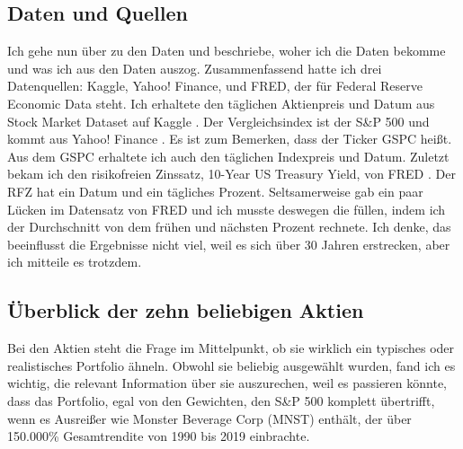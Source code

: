 \documentclass[12pt]{article}
\begin{document}
        \subsection{Daten und Quellen}
    
            Ich gehe nun über zu den Daten und beschriebe, woher ich die Daten bekomme und was ich aus den Daten auszog. 
            Zusammenfassend hatte ich drei Datenquellen: Kaggle, Yahoo! Finance, und FRED, der für Federal Reserve Economic Data steht. 
            Ich erhaltete den täglichen Aktienpreis und Datum aus Stock Market Dataset auf Kaggle \cite{onyshchak}.
            Der Vergleichsindex ist der S\&P 500 und kommt aus Yahoo! Finance \cite{yahoo}. 
            Es ist zum Bemerken, dass der Ticker GSPC heißt. Aus dem GSPC erhaltete ich auch den täglichen Indexpreis und Datum. 
            Zuletzt bekam ich den risikofreien Zinssatz, 10-Year US Treasury Yield, von FRED \cite{fred}. 
            Der RFZ hat ein Datum und ein tägliches Prozent. Seltsamerweise gab ein paar Lücken im Datensatz von FRED und 
            ich musste deswegen die füllen, indem ich der Durchschnitt von dem frühen und nächsten Prozent rechnete. 
            Ich denke, das beeinflusst die Ergebnisse nicht viel, weil es sich über 30 Jahren erstrecken, aber ich mitteile es trotzdem.
            
        \subsection{Überblick der zehn beliebigen Aktien}
    
            Bei den Aktien steht die Frage im Mittelpunkt, ob sie wirklich ein typisches oder realistisches Portfolio ähneln. 
            Obwohl sie beliebig ausgewählt wurden, fand ich es wichtig, 
            die relevant Information über sie auszurechen, weil es passieren könnte, dass das Portfolio, 
            egal von den Gewichten, den S\&P 500 komplett übertrifft, wenn es Ausreißer wie Monster Beverage Corp (MNST) enthält, 
            der über 150.000\% Gesamtrendite von 1990 bis 2019 einbrachte.

            
          
\end{document}
